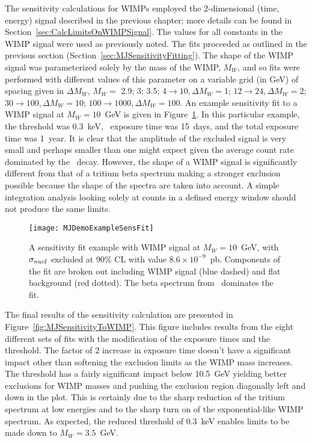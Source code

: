 	The sensitivity calculations for WIMPs employed the 2-dimensional (time, energy) signal described in the previous chapter; more details can be found in Section~\ref{sec:CalcLimitsOnWIMPSignal}.  The values for all constants in the WIMP signal were used as previously noted.  The fits proceeded as outlined in the previous section (Section~\ref{sec:MJSensitivityFitting}).  The shape of the WIMP signal was parameterized solely by the mass of the WIMP, $M_{W}$, and so fits were performed with different values of this parameter on a variable grid (in GeV) of spacing given in $\Delta M_{W}$, $M_{W}=$ 2.9; 3; 3.5; $4\to10, \Delta M_{W} = 1$; $12\to24, \Delta M_{W} = 2$; $30\to100, \Delta M_{W} = 10$; $100\to1000, \Delta M_{W} = 100$.  An example sensitivity fit to a WIMP signal at $M_{W}=10$~GeV is given in Figure~\ref{fig:MJSensitivityToWIMPExample}.  In this particular example, the threshold was 0.3~keV, \hthree~exposure time was 15~days, and the total exposure time was 1~year.  It is clear that the amplitude of the excluded signal is very small and perhaps smaller than one might expect given the average count rate dominated by the \hthree~decay.  However, the shape of a WIMP signal is significantly different from that of a tritium beta spectrum making a stronger exclusion possible because the shape of the spectra are taken into account.  A simple integration analysis looking solely at counts in a defined energy window should not produce the same limits.  
		
			\begin{figure}
				\centering
				\texttt{[image: MJDemoExampleSensFit]}
				\caption[\MJ~\minmod WIMP sensitivity fit example.]{A sensitivity fit example with WIMP  
				signal at $M_{W}=10$~GeV, with $\sigma_{nucl}$ excluded at 90\% CL with value
				 $8.6\times10^{-9}$~pb.  Components of the fit are broken out including WIMP 
				 signal (blue dashed) and flat background (red dotted).  The beta spectrum from \hthree~dominates the fit.}
				\label{fig:MJSensitivityToWIMPExample}
			\end{figure}
	
	The final results of the sensitivity calculation are presented in Figure~\ref{fig:MJSensitivityToWIMP}.  This figure includes results from the eight different sets of fits with the modification of the exposure times and the threshold.  The factor of 2 increase in exposure time doesn't have a significant impact other than softening the exclusion limits as the WIMP mass increases.  The threshold has a fairly significant impact below 10.5~GeV yielding better exclusions for WIMP masses and pushing the exclusion region diagonally left and down in the plot.  This is certainly due to the sharp reduction of the tritium spectrum at low energies and to the sharp turn on of the exponential-like WIMP spectrum.  As expected, the reduced threshold of 0.3~keV enables limits to be made down to $M_{W}=3.5$~GeV.  
	
